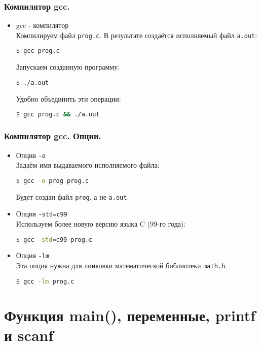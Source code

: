 \documentclass[12pt,pdf,hyperref={unicode}]{beamer}
\begin{document}
\begin{frame}[fragile]
\frametitle{Компилятор gcc.}
\begin{itemize}
\item gcc - компилятор\\
Компилируем файл \texttt{prog.c}. В результате создаётся исполняемый файл \texttt{a.out}:
\begin{lstlisting}[language=bash,backgroundcolor=\color{bashcolor}]
$ gcc prog.c
\end{lstlisting}
Запускаем созданную программу:
\begin{lstlisting}[language=bash,backgroundcolor=\color{bashcolor}]
$ ./a.out
\end{lstlisting}
Удобно объединить эти операции:
\begin{lstlisting}[language=bash,backgroundcolor=\color{bashcolor}]
$ gcc prog.c && ./a.out
\end{lstlisting}
\end{itemize}
\end{frame}

\begin{frame}[fragile]
\frametitle{Компилятор gcc. Опции.}
\begin{itemize}
\item Опция \texttt{-o}\\
Задаём имя выдаваемого исполняемого файла:
\begin{lstlisting}[language=bash,backgroundcolor=\color{bashcolor}]
$ gcc -o prog prog.c
\end{lstlisting}
Будет создан файл \texttt{prog}, а не \texttt{a.out}.\\
\item Опция \texttt{-std=c99}\\
Используем более новую версию языка C (99-го года):
\begin{lstlisting}[language=bash,backgroundcolor=\color{bashcolor}]
$ gcc -std=c99 prog.c
\end{lstlisting}
\item Опция \texttt{-lm}\\
Эта опция нужна для линковки математической библиотеки \texttt{math.h}.
\begin{lstlisting}[language=bash,backgroundcolor=\color{bashcolor}]
$ gcc -lm prog.c
\end{lstlisting}
\end{itemize}
\end{frame}

\section{Функция main(), переменные, printf и scanf}
\end{document}
